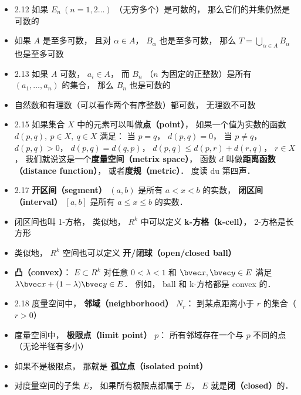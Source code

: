 \begin{itemize}
\item 2.12 如果 $E_n\ (n = 1, 2\dots)$ （无穷多个）是可数的， 那么它们的并集仍然是可数的

\item 如果 $A$ 是至多可数， 且对 $\alpha \in A$， $B_\alpha$ 也是至多可数， 那么 $T = \bigcup_{\alpha \in A} B_\alpha$ 也是至多可数

\item 2.13 如果 $A$ 可数， $a_i \in A$，  而 $B_n$ （$n$ 为固定的正整数）是所有 $(a_1, \dots, a_n)$ 的集合， 那么 $B_n$ 也是可数的

\item 自然数和有理数（可以看作两个有序整数）都可数， 无理数不可数

\item 2.15 如果集合 $X$ 中的元素可以叫做\textbf{点（point）}， 如果一个值为实数的函数 $d(p, q), \ p \in X,\ q \in X$ 满足： 当 $p = q$， $d(p, q) = 0$， 当 $p \ne q$， $d(p, q) > 0$， $d(p, q) = d(q, p)$， $d(p, q) \leqslant d(p, r) + d(r, q)$， $r \in X$， 我们就说这是一个\textbf{度量空间（metrix space）}， 函数 $d$ 叫做\textbf{距离函数（distance function）}， 或者\textbf{度规（metric）}． 度读 du 第四声．

\item 2.17 \textbf{开区间（segment）} $(a, b)$ 是所有 $a < x < b$ 的实数， \textbf{闭区间（interval）} $[a, b]$ 是所有 $a \leqslant x \leqslant b$ 的实数．

\item 闭区间也叫 1-方格， 类似地， $R^k$ 中可以定义 \textbf{k-方格（k-cell）}， 2-方格是长方形

\item 类似地， $R^k$ 空间也可以定义 \textbf{开/闭球（open/closed ball）}

\item \textbf{凸（convex）}： $E \subset R^k$ 对任意 $0 < \lambda < 1$ 和 $\bvec x, \bvec y \in E$ 满足 $\lambda \bvec x + (1 - \lambda) \bvec y \in E$． 例如， ball 和 k-方格都是 convex 的．

\item 2.18 度量空间中， \textbf{邻域（neighborhood）} $N_r$： 到某点距离小于 $r$ 的集合（$r > 0$）

\item 度量空间中， \textbf{极限点（limit point）} $p$： 所有邻域存在一个与 $p$ 不同的点（无论半径有多小）

\item 如果不是极限点， 那就是 \textbf{孤立点（isolated point）}

\item 对度量空间的子集 $E$， 如果所有极限点都属于 $E$， $E$ 就是\textbf{闭（closed）}的．


\end{itemize}

